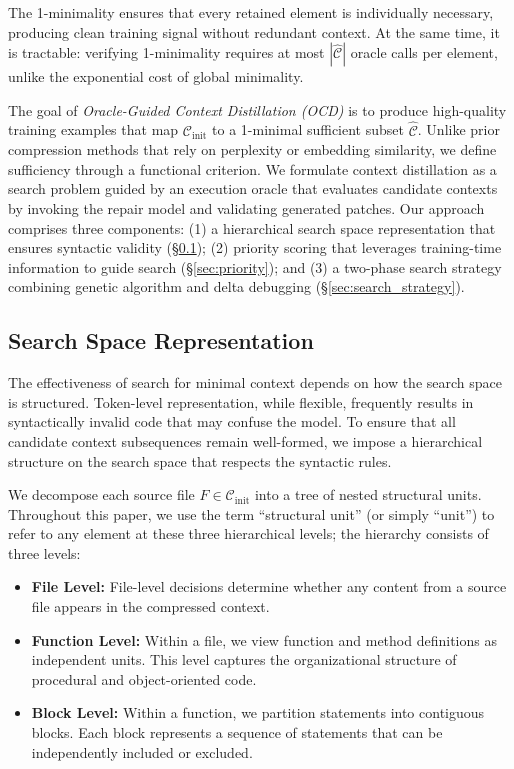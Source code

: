 \documentclass[sigconf,nonacm]{acmart}
\begin{document}
The 1-minimality ensures that every retained element is individually necessary, producing clean training signal without redundant context. At the same time, it is tractable: verifying 1-minimality requires at most $|\hat{\mathcal{C}}|$ oracle calls per element, unlike the exponential cost of global minimality.

The goal of \emph{Oracle-Guided Context Distillation (OCD)} is to produce high-quality training examples that map $\mathcal{C}_\mathrm{init}$ to a 1-minimal sufficient subset $\hat{\mathcal{C}}$. Unlike prior compression methods that rely on perplexity or embedding similarity, we define sufficiency through a functional criterion. We formulate context distillation as a search problem guided by an execution oracle that evaluates candidate contexts by invoking the repair model and validating generated patches. Our approach comprises three components: (1) a hierarchical search space representation that ensures syntactic validity (\S\ref{sec:search_space}); (2) priority scoring that leverages training-time information to guide search (\S\ref{sec:priority}); and (3) a two-phase search strategy combining genetic algorithm and delta debugging (\S\ref{sec:search_strategy}).

\subsection{Search Space Representation}
\label{sec:search_space}

The effectiveness of search for minimal context depends on how the search space is structured. Token-level representation, while flexible, frequently results in syntactically invalid code that may confuse the model. To ensure that all candidate context subsequences remain well-formed, we impose a hierarchical structure on the search space that respects the syntactic rules.

We decompose each source file $F \in \mathcal{C}_\mathrm{init}$ into a tree of nested structural units. Throughout this paper, we use the term ``structural unit'' (or simply ``unit'') to refer to any element at these three hierarchical levels; the hierarchy consists of three levels:

\begin{itemize}
    \item \textbf{File Level:} File-level decisions determine whether any content from a source file appears in the compressed context.
    \item \textbf{Function Level:} Within a file, we view function and method definitions as independent units. This level captures the organizational structure of procedural and object-oriented code.
    \item \textbf{Block Level:} Within a function, we partition statements into contiguous blocks. Each block represents a sequence of statements that can be independently included or excluded.
\end{itemize}
\end{document}
